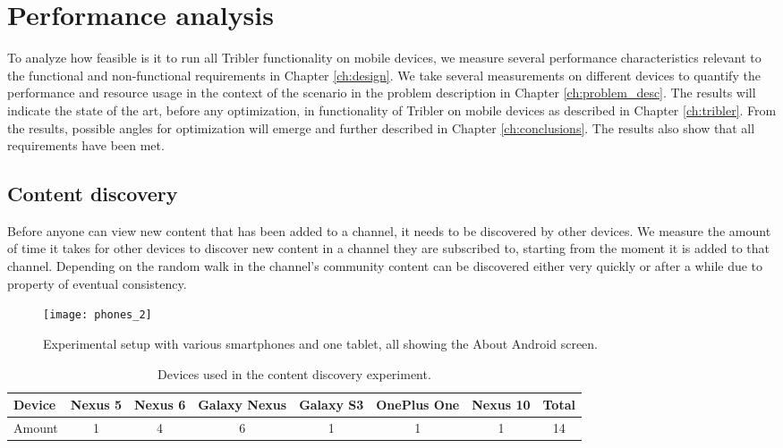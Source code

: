 \chapter{Performance analysis}\label{ch:results}
To analyze how feasible is it to run all Tribler functionality on mobile devices, we measure several performance characteristics relevant to the functional and non-functional requirements in Chapter \ref{ch:design}.
We take several measurements on different devices to quantify the performance and resource usage in the context of the scenario in the problem description in Chapter \ref{ch:problem_desc}.
The results will indicate the state of the art, before any optimization, in functionality of Tribler on mobile devices as described in Chapter \ref{ch:tribler}.
From the results, possible angles for optimization will emerge and further described in Chapter \ref{ch:conclusions}.
The results also show that all requirements have been met.


\section{Content discovery}\label{sec:content_discovery}
Before anyone can view new content that has been added to a channel, it needs to be discovered by other devices.
We measure the amount of time it takes for other devices to discover new content in a channel they are subscribed to, starting from the moment it is added to that channel.
Depending on the random walk in the channel's community content can be discovered either very quickly or after a while due to property of eventual consistency.
\begin{figure}[H]
	\centering
	\texttt{[image: phones\_2]}
	\caption{Experimental setup with various smartphones and one tablet, all showing the About Android screen.}
	\label{fig:phones_2}
\end{figure}

\begin{table}[H]
	\begin{tabular}{l | *{6}{c} || c} \hline
		Device & Nexus 5 & Nexus 6 & Galaxy Nexus & Galaxy S3 & OnePlus One & Nexus 10 & Total \\ \hline
		Amount & 1 & 4 & 6 & 1 & 1 & 1 & 14 \\ \hline
	\end{tabular}
	\caption{Devices used in the content discovery experiment.}
	\label{table:devices}
\end{table}

